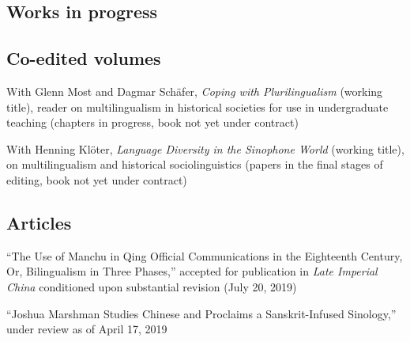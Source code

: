 \documentclass[10pt,a4paper]{article}
\newcommand{\years}[1]{\marginnote{\scriptsize #1}}
\begin{document}
\begin{exclude}

\section*{Works in progress}




\subsection*{Co-edited volumes%
}

\noindent \years{\hspace{0.1in}。}With Glenn Most and Dagmar Schäfer, \emph{Coping with Plurilingualism} (working title), reader on multilingualism in historical societies for use in undergraduate teaching (chapters in progress, book not yet under contract)

\noindent \years{\hspace{0.1in}。}With Henning Klöter, \emph{Language Diversity in the Sinophone World} (working title), on multilingualism and historical sociolinguistics (papers in the final stages of editing, book not yet under contract)


\subsection*{Articles}

\noindent \years{\hspace{0.1in}。}``The Use of Manchu in Qing Official Communications in the Eighteenth Century, Or, Bilingualism in Three Phases,'' accepted for publication in \emph{Late Imperial China} conditioned upon substantial revision (July 20, 2019)

\noindent \years{\hspace{0.1in}。}``Joshua Marshman Studies Chinese and Proclaims a Sanskrit-Infused Sinology,'' under review as of April 17, 2019 %


\end{exclude}
\end{document}
